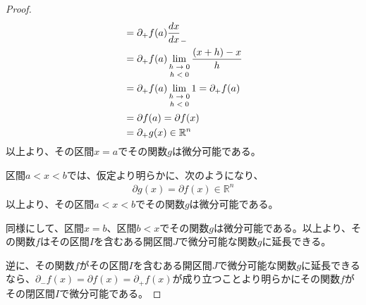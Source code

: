 \documentclass[dvipdfmx]{jsarticle}
\begin{document}
\begin{proof}
\begin{align*}
&= \partial_{+}f(a)\frac{dx}{dx}_{-}\\
&= \partial_{+}f(a)\lim_{\scriptsize \begin{matrix}
h \rightarrow 0 \\
h < 0 \\
\end{matrix}}\frac{(x + h) - x}{h}\\
&= \partial_{+}f(a)\lim_{\scriptsize \begin{matrix}
h \rightarrow 0 \\
h < 0 \\
\end{matrix}}1 = \partial_{+}f(a)\\
&= \partial f(a) = \partial f(x)\\
&= \partial_{+}g(x) \in \mathbb{R}^{n}
\end{align*}
以上より、その区間$x = a$でその関数$g$は微分可能である。\par
区間$a < x < b$では、仮定より明らかに、次のようになり、
\begin{align*}
\partial g(x) = \partial f(x) \in \mathbb{R}^{n}
\end{align*}
以上より、その区間$a < x < b$でその関数$g$は微分可能である。\par
同様にして、区間$x = b$、区間$b < x$でその関数$g$は微分可能である。以上より、その関数$f$はその区間$I$を含むある開区間$J$で微分可能な関数$g$に延長できる。\par
逆に、その関数$f$がその区間$I$を含むある開区間$J$で微分可能な関数$g$に延長できるなら、$\partial_{-}f(x) = \partial f(x) = \partial_{+}f(x)$が成り立つことより明らかにその関数$f$がその閉区間$I$で微分可能である。
\end{proof}
\end{document}
